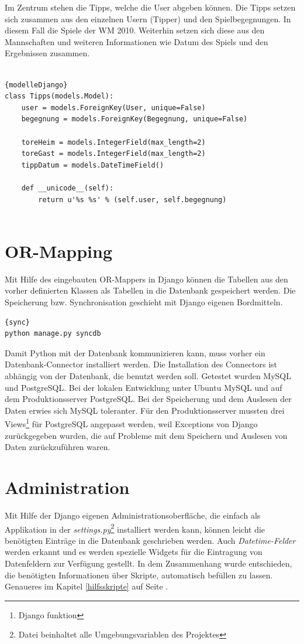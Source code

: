 Im Zentrum stehen die Tipps, welche die User abgeben können. Die Tipps setzen
sich zusammen aus den einzelnen Usern (Tipper) und den Spielbegegnungen. In
diesem Fall die Spiele der WM 2010. Weiterhin setzen sich diese aus den
Mannschaften und weiteren Informationen wie Datum des Spiels und den
Ergebnissen zusammen.
\\
\\

\begin{lstlisting}[caption=Modelle in Django]{modelleDjango}
class Tipps(models.Model):
    user = models.ForeignKey(User, unique=False)
    begegnung = models.ForeignKey(Begegnung, unique=False)
    
    toreHeim = models.IntegerField(max_length=2)
    toreGast = models.IntegerField(max_length=2)
    tippDatum = models.DateTimeField()
    
    def __unicode__(self):
        return u'%s %s' % (self.user, self.begegnung)
   
\end{lstlisting}

\section{OR-Mapping}
Mit Hilfe des eingebauten OR-Mappers in Django können die Tabellen aus den
vorher definierten Klassen als Tabellen in die Datenbank gespeichert werden.
Die Speicherung bzw. Synchronisation geschieht mit Django eigenen Bordmitteln.

\begin{lstlisting}[caption=Datenbanksynchronisation]{sync}
python manage.py syncdb
\end{lstlisting}

Damit Python mit der Datenbank kommunizieren kann, muss vorher ein
Datenbank-Connector installiert werden. Die Installation des Connectors ist 
abhängig von der Datenbank, die benutzt werden soll. Getestet wurden MySQL und 
PostgreSQL. Bei der lokalen Entwicklung unter Ubuntu MySQL und auf dem 
Produktionsserver PostgreSQL. Bei der Speicherung und dem Auslesen der Daten 
erwies sich MySQL toleranter. Für den Produktionsserver mussten drei 
Views\footnote{Django funktion} für PostgreSQL angepasst werden, weil
Exceptions von Django zurückgegeben wurden, die auf Probleme mit dem Speichern 
und Auslesen von Daten zurückzuführen waren.

\section{Administration}
Mit Hilfe der Django eigenen Administrationsoberfläche, die einfach als
Applikation in der \emph{settings.py}\footnote{Datei beinhaltet alle
Umgebungsvariablen des Projektes} installiert werden kann, können leicht die
benötigten Einträge in die Datenbank geschrieben werden. Auch
\emph{Datetime-Felder} werden erkannt und es werden spezielle Widgets für die
Eintragung von Datenfeldern zur Verfügung gestellt. In dem Zusammenhang wurde
entschieden, die benötigten Informationen über Skripte, automatisch befüllen zu
lassen. Genaueres im Kapitel \ref{hilfsskripte} auf Seite
\pageref{hilfsskripte}.


